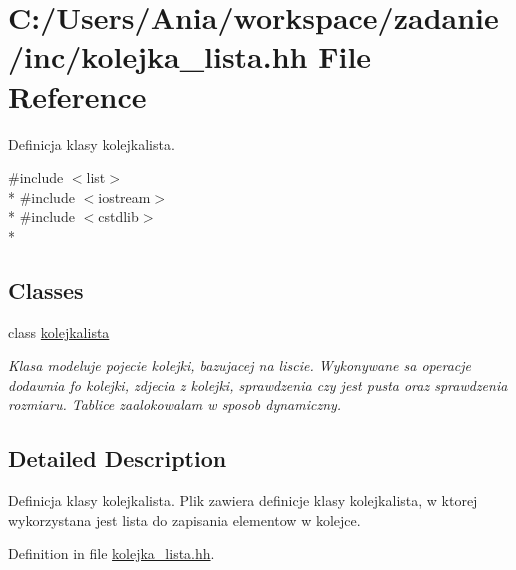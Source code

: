 \hypertarget{kolejka__lista_8hh}{\section{C\-:/\-Users/\-Ania/workspace/zadanie/inc/kolejka\-\_\-lista.hh File Reference}
\label{kolejka__lista_8hh}
}


Definicja klasy kolejkalista.  


{\ttfamily \#include $<$list$>$}\\*
{\ttfamily \#include $<$iostream$>$}\\*
{\ttfamily \#include $<$cstdlib$>$}\\*
\subsection*{Classes}
\begin{DoxyCompactItemize}
\item 
class \hyperlink{classkolejkalista}{kolejkalista}
\begin{DoxyCompactList}\small\item\em Klasa modeluje pojecie kolejki, bazujacej na liscie. Wykonywane sa operacje dodawnia fo kolejki, zdjecia z kolejki, sprawdzenia czy jest pusta oraz sprawdzenia rozmiaru. Tablice zaalokowalam w sposob dynamiczny. \end{DoxyCompactList}\end{DoxyCompactItemize}


\subsection{Detailed Description}
Definicja klasy kolejkalista. Plik zawiera definicje klasy kolejkalista, w ktorej wykorzystana jest lista do zapisania elementow w kolejce. 

Definition in file \hyperlink{kolejka__lista_8hh_source}{kolejka\-\_\-lista.\-hh}.

